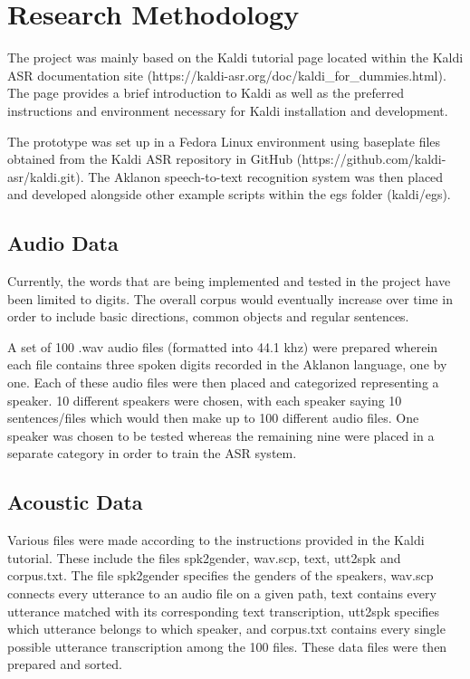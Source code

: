 
\chapter{Research Methodology}

The project was mainly based on the Kaldi tutorial page located within the Kaldi ASR documentation site (https://kaldi-asr.org/doc/kaldi_for_dummies.html). The page provides a brief introduction to Kaldi as well as the preferred instructions and environment necessary for Kaldi installation and development.

The prototype was set up in a Fedora Linux environment using baseplate files obtained from the Kaldi ASR repository in GitHub (https://github.com/kaldi-asr/kaldi.git). The Aklanon speech-to-text recognition system was then placed and developed alongside other example scripts within the egs folder (kaldi/egs).

\section{Audio Data}

Currently, the words that are being implemented and tested in the project have been limited to digits. The overall corpus would eventually increase over time in order to include basic directions, common objects and regular sentences.


A set of 100 .wav audio files (formatted into 44.1 khz) were prepared wherein each file contains three spoken digits recorded in the Aklanon language, one by one. Each of these audio files were then placed and categorized representing a speaker. 10 different speakers were chosen, with each speaker saying 10 sentences/files which would then make up to 100 different audio files. One speaker was chosen to be tested whereas the remaining nine were placed in a separate category in order to train the ASR system.

\section{Acoustic Data}

Various files were made according to the instructions provided in the Kaldi tutorial. These include the files spk2gender, wav.scp, text, utt2spk and corpus.txt. The file spk2gender specifies the genders of the speakers, wav.scp connects every utterance to an audio file on a given path, text contains every utterance matched with its corresponding text transcription, utt2spk specifies which utterance belongs to which speaker, and corpus.txt contains every single possible utterance transcription among the 100 files. These data files were then prepared and sorted.

